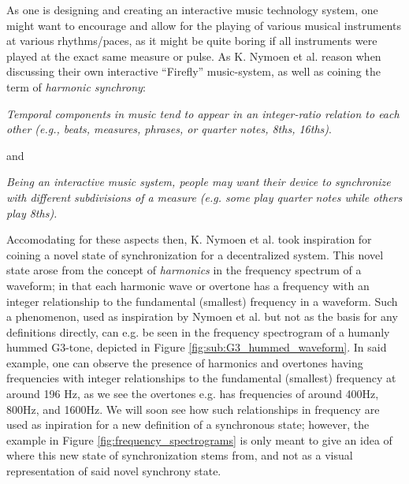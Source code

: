 As one is designing and creating an interactive music technology system, one might want to encourage and allow for the playing of various musical instruments at various rhythms/paces, as it might be quite boring if all instruments were played at the exact same measure or pulse. As K. Nymoen et al. \cite{nymoen_synch} reason when discussing their own interactive ``Firefly'' music-system, as well as coining the term of \textit{harmonic synchrony}: \nl

\textit{Temporal components in music tend to appear in an integer-ratio relation to each other (e.g., beats, measures, phrases, or quarter notes, 8ths, 16ths)}. \nl

and \nl

\textit{Being an interactive music system, people may want their device to synchronize with different subdivisions of a measure (e.g. some play quarter notes while others play 8ths).} \nl

Accomodating for these aspects then, K. Nymoen et al. took inspiration for coining a novel state of synchronization for a decentralized system. This novel state arose from the concept of \textit{harmonics} in the frequency spectrum of a waveform; in that each harmonic wave or overtone has a frequency with an integer relationship to the fundamental (smallest) frequency in a waveform. Such a phenomenon, used as inspiration by Nymoen et al. but not as the basis for any definitions directly, can e.g. be seen in the frequency spectrogram of a humanly hummed G3-tone, depicted in Figure \ref{fig:sub:G3_hummed_waveform}. In said example, one can observe the presence of harmonics and overtones having frequencies with integer relationships to the fundamental (smallest) frequency at around 196 Hz, as we see the overtones e.g. has frequencies of around 400Hz, 800Hz, and 1600Hz. We will soon see how such relationships in frequency are used as inpiration for a new definition of a synchronous state; however, the example in Figure \ref{fig:frequency_spectrograms} is only meant to give an idea of where this new state of synchronization stems from, and not as a visual representation of said novel synchrony state.

